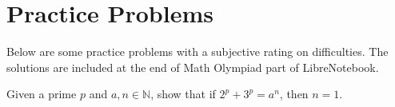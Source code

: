\documentclass[../../../main.tex]{subfiles}
\begin{document}
\section{Practice Problems}

Below are some practice problems with a subjective rating on
difficulties. The solutions are included at the end of Math Olympiad
part of LibreNotebook.

\begin{listproblem}
Given a prime $p$ and $a, n \in \mathbb{N}$, show that if
$2^p + 3^p = a^n$, then $n = 1$.
\end{listproblem}
\end{document}

